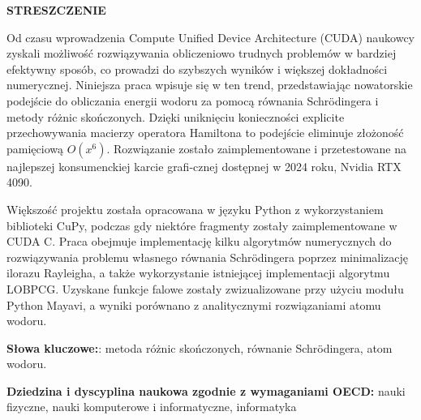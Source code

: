 \noindent
\begingroup
\fontsize{12pt}{1.5pt}\selectfont
\textbf{STRESZCZENIE}
\endgroup

\vspace{3mm}

Od czasu wprowadzenia Compute Unified Device Architecture (CUDA) naukowcy zyskali możliwość rozwiązywania obliczeniowo trudnych problemów w bardziej efektywny sposób, co prowadzi do szybszych wyników i większej dokładności numerycznej. Niniejsza praca wpisuje się w ten trend, przedstawiając nowatorskie podejście do obliczania energii wodoru za pomocą równania Schrödingera i metody różnic skończonych. Dzięki uniknięciu konieczności explicite przechowywania macierzy operatora Hamiltona to podejście eliminuje złożoność pamięciową $O(x^6)$. Rozwiązanie zostało zaimplementowane i przetestowane na najlepszej konsumenckiej karcie grafi-cznej dostępnej w 2024 roku, Nvidia RTX 4090.

Większość projektu została opracowana w języku Python z wykorzystaniem biblioteki CuPy, podczas gdy niektóre fragmenty zostały zaimplementowane w CUDA C. Praca obejmuje implementację kilku algorytmów numerycznych do rozwiązywania problemu własnego równania Schrödingera poprzez minimalizację ilorazu Rayleigha, a także wykorzystanie istniejącej implementacji algorytmu LOBPCG. Uzyskane funkcje falowe zostały zwizualizowane przy użyciu modułu Python Mayavi, a wyniki porównano z analitycznymi rozwiązaniami atomu wodoru.

\textbf{Słowa kluczowe:}: metoda różnic skończonych, równanie Schrödingera, atom wodoru.

\textbf{Dziedzina i dyscyplina naukowa zgodnie z wymaganiami OECD:}
nauki fizyczne, nauki komputerowe i informatyczne, informatyka